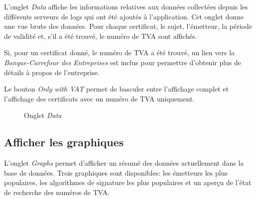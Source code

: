 \documentclass{article}
\begin{document}
L'onglet \emph{Data} affiche les informations relatives aux données collectées depuis les différents serveurs de logs qui ont été ajoutés à l'application.  Cet onglet donne une vue brute des données.  Pour chaque certificat, le sujet, l'émetteur, la période de validité et, s'il a été trouvé, le numéro de TVA sont affichés.

Si, pour un certificat donné, le numéro de TVA a été trouvé, un lien vers la \emph{Banque-Carrefour des Entreprises} est inclus pour permettre d'obtenir plus de détails à propos de l'entreprise.

Le bouton \emph{Only with VAT} permet de basculer entre l'affichage complet et l'affichage des certificats avec un numéro de TVA uniquement.  


\begin{figure}
\noindent{}
\caption{Onglet \emph{Data}}
\label{data-fig}
\end{figure}


\subsection{Afficher les graphiques}

L'onglet \emph{Graphs} permet d'afficher un résumé des données actuellement dans la base de données.  Trois graphiques sont disponibles: les émetteurs les plus populaires, les algorithmes de signature les plus populaires et un aperçu de l'état de recherche des numéros de TVA.
\end{document}
